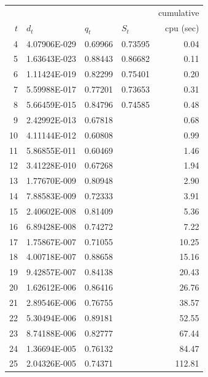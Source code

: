 \begin {tabular}{|rlllr|}
\hline
 &&&&  cumulative \\
   $t$ &      $d_t$  &      $q_t$  &      $S_t$  &  cpu (sec)\\
\hline
    4  & 4.07906E-029 &     0.69966 &     0.73595 &      0.04 \\
    5  & 1.63643E-023 &     0.88443 &     0.86682 &      0.11 \\
    6  & 1.11424E-019 &     0.82299 &     0.75401 &      0.20 \\
    7  & 5.59988E-017 &     0.77201 &     0.73653 &      0.31 \\
    8  & 5.66459E-015 &     0.84796 &     0.74585 &      0.48 \\
    9  & 2.42992E-013 &     0.67818 &             &      0.68 \\
   10  & 4.11144E-012 &     0.60808 &             &      0.99 \\
   11  & 5.86855E-011 &     0.60469 &             &      1.46 \\
   12  & 3.41228E-010 &     0.67268 &             &      1.94 \\
   13  & 1.77670E-009 &     0.80948 &             &      2.90 \\
   14  & 7.88583E-009 &     0.72333 &             &      3.91 \\
   15  & 2.40602E-008 &     0.81409 &             &      5.36 \\
   16  & 6.89428E-008 &     0.74272 &             &      7.22 \\
   17  & 1.75867E-007 &     0.71055 &             &     10.25 \\
   18  & 4.00718E-007 &     0.88658 &             &     15.16 \\
   19  & 9.42857E-007 &     0.84138 &             &     20.43 \\
   20  & 1.62612E-006 &     0.86416 &             &     26.76 \\
   21  & 2.89546E-006 &     0.76755 &             &     38.57 \\
   22  & 5.30494E-006 &     0.89181 &             &     52.55 \\
   23  & 8.74188E-006 &     0.82777 &             &     67.44 \\
   24  & 1.36694E-005 &     0.76132 &             &     84.47 \\
   25  & 2.04326E-005 &     0.74371 &             &    112.81 \\
\hline
\end {tabular}
